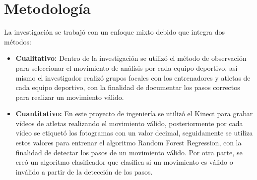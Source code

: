 \chapter{Metodolog\'ia}
La investigaci\'on se trabaj\'o con un enfoque mixto debido que integra dos m\'etodos:
\begin{itemize}
	\item \textbf{Cualitativo:} Dentro de la investigaci\'on se utiliz\'o el m\'etodo de observaci\'on para seleccionar el movimiento de an\'alisis por cada equipo deportivo, as\'i mismo el investigador realiz\'o grupos focales con los entrenadores y atletas de cada equipo deportivo, con la finalidad de documentar los pasos correctos para realizar un movimiento v\'alido.
	\item \textbf{Cuantitativo:} En este proyecto de ingenier\'ia se utiliz\'o el Kinect para grabar v\'ideos de atletas realizando el movimiento v\'alido, posteriormente por cada v\'ideo se etiquet\'o los fotogramas con un valor decimal, seguidamente se utiliza estos valores para entrenar el algoritmo Random Forest Regression, con la finalidad de detectar los pasos de un movimiento v\'alido. Por otra parte, se cre\'o un algoritmo clasificador que clasifica si un movimiento es v\'alido o inv\'alido a partir de la detecci\'on de los pasos.
\end{itemize}



